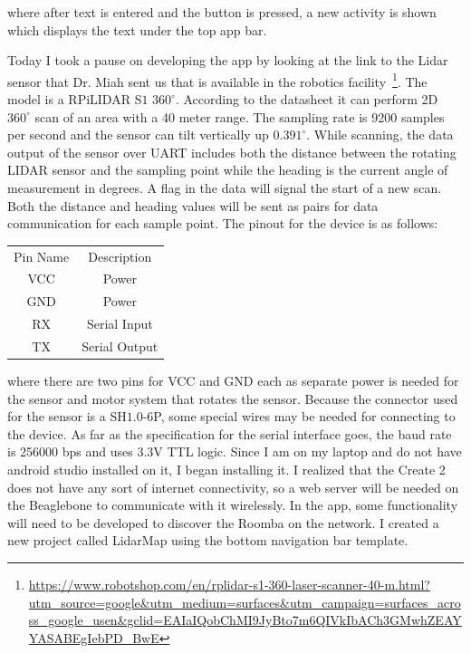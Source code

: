 \documentclass[fontsize=11pt, %
                             paper=a4, %
                             twoside, %
                             captions=tableheading,
                             index=totoc,
                             hyperref]{labbook}
\begin{document}
\begin{addmargin}[0cm]{0cm}
\begin{figure}[H]
\end{figure}
where after text is entered and the button is pressed, a new activity is shown which displays the text under the top app bar.

Today I took a pause on developing the app by looking at the link to the Lidar sensor that Dr. Miah sent us that is available in the robotics facility~\footnote{\url{https://www.robotshop.com/en/rplidar-s1-360-laser-scanner-40-m.html?utm_source=google&utm_medium=surfaces&utm_campaign=surfaces_across_google_usen&gclid=EAIaIQobChMI9JyBto7m6QIVkIbACh3GMwhZEAYYASABEgIebPD_BwE}}. 
The model is a RPiLIDAR S$1$ $360^\circ$. According to the datasheet it can perform 2D $360^\circ$ scan of an area with a 40 meter range. The sampling rate is 9200 samples per second and the sensor can tilt vertically up $0.391^\circ$. While scanning, the data output of the sensor over UART includes both the distance between the rotating LIDAR sensor and the sampling point while the heading is the current angle of measurement in degrees. A flag in the data will signal the start of a new scan. Both the distance and heading values will be sent as pairs for data communication for each sample point. The pinout for the device is as follows:

\begin{center}
\begin{tabular}{|c|c|}
\hline
Pin Name & Description \\
VCC & Power\\
GND & Power\\
RX & Serial Input\\
TX & Serial Output\\
\hline
\end{tabular}
\end{center}
where there are two pins for VCC and GND each as separate power is needed for the sensor and motor system that rotates the sensor. Because the connector used for the sensor is a SH$1.0$-$6$P, some special wires may be needed for connecting to the device. As far as the specification for the serial interface goes, the baud rate is 256000 bps and uses 3.3V TTL logic.
\smallbreak\noindent
Since I am on my laptop and do not have android studio installed on it, I began installing it. I realized that the Create 2 does not have any sort of internet connectivity, so a web server will be needed on the Beaglebone to communicate with it wirelessly. In the app, some functionality will need to be developed to discover the Roomba on the network. 
\smallbreak\noindent
I created a new project called LidarMap using the bottom navigation bar template.


\end{addmargin}
\end{document}
